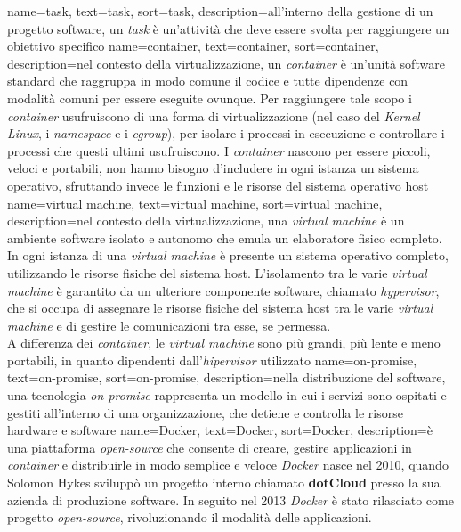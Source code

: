 {
    name={task},
    text=task,
    sort=task,
    description={all'interno della gestione di un progetto software, un \textit{task} è un'attività che deve essere svolta per raggiungere un obiettivo specifico}
}
{
    name={container},
    text=container,
    sort=container,
    description={nel contesto della virtualizzazione, un \textit{container} è un'unità software standard che raggruppa in modo comune il codice e tutte 
    dipendenze con modalità comuni per essere eseguite ovunque. Per raggiungere tale scopo i \textit{container} usufruiscono di una forma 
    di virtualizzazione (nel caso del \textit{Kernel Linux}, i \textit{namespace} e i \textit{cgroup}), per isolare i processi in esecuzione 
    e controllare i processi che questi ultimi usufruiscono.
    I \textit{container} nascono per essere piccoli, veloci e portabili, non hanno bisogno d'includere in ogni istanza un sistema operativo,
    sfruttando invece le funzioni e le risorse del sistema operativo host}
}
{
    name={virtual machine},
    text=virtual machine,
    sort=virtual machine,
    description={nel contesto della virtualizzazione, una \textit{virtual machine} è un ambiente software isolato e autonomo che emula un elaboratore fisico completo.
    In ogni istanza di una \textit{virtual machine} è presente un sistema operativo completo, utilizzando le risorse 
    fisiche del sistema host. L'isolamento tra le varie \textit{virtual machine} è garantito da un 
    ulteriore componente software, chiamato \textit{hypervisor}, che si occupa di assegnare le risorse fisiche del sistema host tra le varie \textit{virtual machine} e di gestire le comunicazioni tra esse, se permessa.\\
    A differenza dei \textit{container}, le \textit{virtual machine} sono più grandi, più lente e meno portabili, in quanto dipendenti dall'\textit{hipervisor} utilizzato}
}
{
    name={on-promise},
    text=on-promise,
    sort=on-promise,
    description={nella distribuzione del software, una tecnologia \textit{on-promise} rappresenta
    un modello in cui i servizi sono ospitati e gestiti all'interno di una 
    organizzazione, che detiene e controlla le risorse hardware e software}
}
{
    name={Docker},
    text=Docker,
    sort=Docker,
    description={è una piattaforma \textit{open-source} che consente di creare, gestire applicazioni in \textit{container} e distribuirle in modo semplice e veloce
    \textit{Docker} nasce nel 2010, quando Solomon Hykes sviluppò un progetto interno chiamato \textbf{dotCloud} presso la sua azienda di produzione software. In seguito 
    nel 2013 \textit{Docker} è stato rilasciato come progetto \textit{open-source}, rivoluzionando il modalità delle applicazioni.}
}
